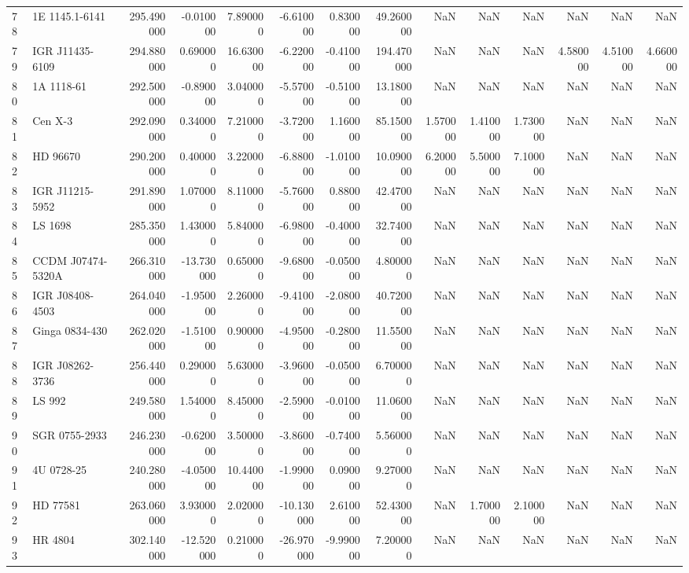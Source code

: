 \begin{tabular}{llrrrrrrrrrrrr}
78 & 1E 1145.1-6141 & 295.490000 & -0.010000 & 7.890000 & -6.610000 & 0.830000 & 49.260000 & NaN & NaN & NaN & NaN & NaN & NaN \\
79 & IGR J11435-6109 & 294.880000 & 0.690000 & 16.630000 & -6.220000 & -0.410000 & 194.470000 & NaN & NaN & NaN & 4.580000 & 4.510000 & 4.660000 \\
80 & 1A 1118-61 & 292.500000 & -0.890000 & 3.040000 & -5.570000 & -0.510000 & 13.180000 & NaN & NaN & NaN & NaN & NaN & NaN \\
81 & Cen X-3 & 292.090000 & 0.340000 & 7.210000 & -3.720000 & 1.160000 & 85.150000 & 1.570000 & 1.410000 & 1.730000 & NaN & NaN & NaN \\
82 & HD 96670 & 290.200000 & 0.400000 & 3.220000 & -6.880000 & -1.010000 & 10.090000 & 6.200000 & 5.500000 & 7.100000 & NaN & NaN & NaN \\
83 & IGR J11215-5952 & 291.890000 & 1.070000 & 8.110000 & -5.760000 & 0.880000 & 42.470000 & NaN & NaN & NaN & NaN & NaN & NaN \\
84 & LS 1698 & 285.350000 & 1.430000 & 5.840000 & -6.980000 & -0.400000 & 32.740000 & NaN & NaN & NaN & NaN & NaN & NaN \\
85 & CCDM J07474-5320A & 266.310000 & -13.730000 & 0.650000 & -9.680000 & -0.050000 & 4.800000 & NaN & NaN & NaN & NaN & NaN & NaN \\
86 & IGR J08408-4503 & 264.040000 & -1.950000 & 2.260000 & -9.410000 & -2.080000 & 40.720000 & NaN & NaN & NaN & NaN & NaN & NaN \\
87 & Ginga 0834-430 & 262.020000 & -1.510000 & 0.900000 & -4.950000 & -0.280000 & 11.550000 & NaN & NaN & NaN & NaN & NaN & NaN \\
88 & IGR J08262-3736 & 256.440000 & 0.290000 & 5.630000 & -3.960000 & -0.050000 & 6.700000 & NaN & NaN & NaN & NaN & NaN & NaN \\
89 & LS 992 & 249.580000 & 1.540000 & 8.450000 & -2.590000 & -0.010000 & 11.060000 & NaN & NaN & NaN & NaN & NaN & NaN \\
90 & SGR 0755-2933 & 246.230000 & -0.620000 & 3.500000 & -3.860000 & -0.740000 & 5.560000 & NaN & NaN & NaN & NaN & NaN & NaN \\
91 & 4U 0728-25 & 240.280000 & -4.050000 & 10.440000 & -1.990000 & 0.090000 & 9.270000 & NaN & NaN & NaN & NaN & NaN & NaN \\
92 & HD 77581 & 263.060000 & 3.930000 & 2.020000 & -10.130000 & 2.610000 & 52.430000 & NaN & 1.700000 & 2.100000 & NaN & NaN & NaN \\
93 & HR 4804 & 302.140000 & -12.520000 & 0.210000 & -26.970000 & -9.990000 & 7.200000 & NaN & NaN & NaN & NaN & NaN & NaN \\

\end{tabular}
